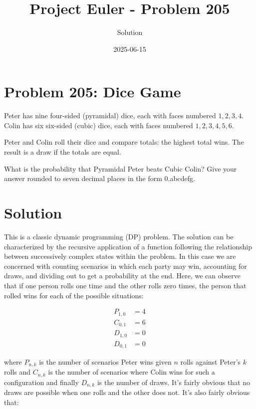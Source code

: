 \documentclass{article}
\title{Project Euler - Problem 205}
\author{Solution}
\date{2025-06-15}
\begin{document}
\maketitle

\section*{Problem 205: Dice Game}


Peter has nine four-sided (pyramidal) dice, each with faces numbered $1, 2, 3, 4$.
Colin has six six-sided (cubic) dice, each with faces numbered $1, 2, 3, 4, 5, 6$.

\par
Peter and Colin roll their dice and compare totals: the highest total wins. The result is a draw if the totals are equal.

\par
What is the probability that Pyramidal Peter beats Cubic Colin? Give your answer rounded to seven decimal places in the form 0.abcdefg.

\par


\section*{Solution}

This is a classic dynamic programming (DP) problem.  The solution can be characterized by the recursive application of a function following the relationship between successively complex states within the problem.  In this case we are concerned with counting scenarios in which each party may win, accounting for draws, and dividing out to get a probability at the end.  Here, we can observe that if one person rolls one time and the other rolls zero times, the person that rolled wins for each of the possible situations:

\begin{align*}
    P_{1,0} &= 4 \\
    C_{0,1} &= 6 \\
    D_{1,0} &= 0 \\
    D_{0,1} &= 0
\end{align*}

where $P_{n,k}$ is the number of scenarios Peter wins given $n$ rolls against Peter's $k$ rolls and $C_{n,k}$ is the number of scenarios where Colin wins for such a configuration and finally $D_{n,k}$ is the number of draws.  It's fairly obvious that no draws are possible when one rolls and the other does not.  It's also fairly obvious that:
\end{document}

